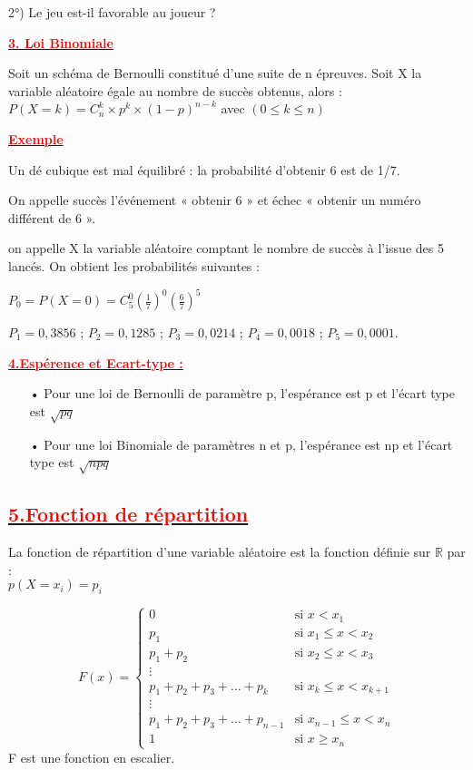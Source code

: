 \documentclass[12pt]{article}
\begin{document}
2°) Le jeu est-il favorable au joueur ?

\underline{\textbf{\textcolor{red}{3. Loi Binomiale}}}

Soit un schéma de Bernoulli constitué d’une suite de n épreuves.
Soit X la variable aléatoire égale au nombre de succès obtenus, alors :\\
$P(X=k)=C_{n}^{k}\times p^{k}\times (1-p)^{n-k}$ avec $(0\leq k\leq n)$

\underline{\textbf{\textcolor{red}{Exemple}}}

Un dé cubique est mal équilibré : la probabilité d’obtenir 6 est de 1/7.

On appelle succès l’événement « obtenir 6 » et échec « obtenir un numéro différent de 6 ».

on appelle X la variable aléatoire comptant le nombre de succès à l’issue des 5 lancés. On obtient les probabilités suivantes :

$P_{0}=P(X=0)=C_{5}^{0}(\frac{1}{7})^{0}(\frac{6}{7})^{5}$

$P_{1} =0,3856$ ; $P_{2} = 0,1285$ ; $P_{3} = 0,0214$ ; $P_{4} = 0,0018$ ; $P_{5} = 0,0001$.

\underline{\textbf{\textcolor{red}{4.Espérence et Ecart-type :}}}

\begin{itemize}
\item[•] Pour une loi de Bernoulli de paramètre p, l’espérance est p et l’écart type est $\sqrt{pq}$
\item[•] Pour une loi Binomiale de paramètres n et p, l’espérance est np et l’écart type est 
$\sqrt{npq} $
\end{itemize}
\subsection*{\underline{\textbf{\textcolor{red}{5.Fonction de répartition}}}}
La fonction de répartition d'une variable aléatoire est la fonction définie sur $\mathbb{R}$ par :\\
$p(X=x_{i})=p_{i}$

\begin{equation*}
F(x)=\begin{cases}
0 & \text{si } x < x_{1}\\
p_{1} & \text{si } x_{1} \leq x < x_{2}\\
p_{1} + p_{2} & \text{si } x_{2} \leq x < x_{3}\\
\vdots \\
p_{1} + p_{2} + p_{3} + \ldots + p_{k} & \text{si } x_{k} \leq x < x_{k+1}\\
\vdots \\
p_{1} + p_{2} + p_{3} + \ldots + p_{n-1} & \text{si } x_{n-1} \leq x < x_{n}\\
1 & \text{si } x \geq x_{n}
\end{cases}
\end{equation*}
F  est une fonction en escalier.
\end{document}
